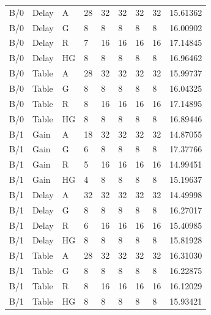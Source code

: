 \begin{longtable}{lllllllll}
B/0 & Delay & A & 28 & 32 & 32 & 32 & 32 & 15.61362 \\
B/0 & Delay & G & 8 & 8 & 8 & 8 & 8 & 16.00902 \\
B/0 & Delay & R & 7 & 16 & 16 & 16 & 16 & 17.14845 \\
B/0 & Delay & HG & 8 & 8 & 8 & 8 & 8 & 16.96462 \\
B/0 & Table & A & 28 & 32 & 32 & 32 & 32 & 15.99737 \\
B/0 & Table & G & 8 & 8 & 8 & 8 & 8 & 16.04325 \\
B/0 & Table & R & 8 & 16 & 16 & 16 & 16 & 17.14895 \\
B/0 & Table & HG & 8 & 8 & 8 & 8 & 8 & 16.89446 \\
B/1 & Gain & A & 18 & 32 & 32 & 32 & 32 & 14.87055 \\
B/1 & Gain & G & 6 & 8 & 8 & 8 & 8 & 17.37766 \\
B/1 & Gain & R & 5 & 16 & 16 & 16 & 16 & 14.99451 \\
B/1 & Gain & HG & 4 & 8 & 8 & 8 & 8 & 15.19637 \\
B/1 & Delay & A & 32 & 32 & 32 & 32 & 32 & 14.49998 \\
B/1 & Delay & G & 8 & 8 & 8 & 8 & 8 & 16.27017 \\
B/1 & Delay & R & 6 & 16 & 16 & 16 & 16 & 15.40985 \\
B/1 & Delay & HG & 8 & 8 & 8 & 8 & 8 & 15.81928 \\
B/1 & Table & A & 28 & 32 & 32 & 32 & 32 & 16.31030 \\
B/1 & Table & G & 8 & 8 & 8 & 8 & 8 & 16.22875 \\
B/1 & Table & R & 8 & 16 & 16 & 16 & 16 & 16.12029 \\
B/1 & Table & HG & 8 & 8 & 8 & 8 & 8 & 15.93421 \\
\bottomrule
\end{longtable}
